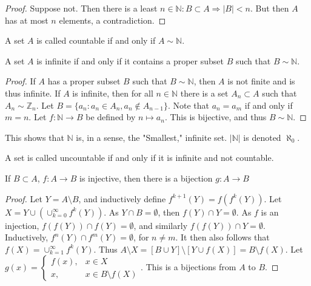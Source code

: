 \documentclass[crop=false,class=book,oneside]{standalone}
\begin{document}
            \begin{proof}
            Suppose not. Then there is a least $n\in \mathbb{N}:B\subset A\Rightarrow |B|<n$. But then $A$ has at most $n$ elements, a contradiction.
            \end{proof}
            \begin{definition}
            A set $A$ is called countable if and only if $A\sim \mathbb{N}$.
            \end{definition}
            \begin{theorem}
            A set $A$ is infinite if and only if it contains a proper subset $B$ such that $B\sim \mathbb{N}$.
            \end{theorem}
            \begin{proof}
            If $A$ has a proper subset $B$ such that $B\sim \mathbb{N}$, then $A$ is not finite and is thus infinite. If $A$ is infinite, then for all $n\in \mathbb{N}$ there is a set $A_n\subset A$ such that $A_n \sim \mathbb{Z}_n$. Let $B = \{a_n: a_n \in A_n, a_n \notin A_{n-1}\}$. Note that $a_{n} = a_{m}$ if and only if $m= n$. Let $f:\mathbb{N} \rightarrow B$ be defined by $n\mapsto a_n$. This is bijective, and thus $B\sim \mathbb{N}$.
            \end{proof}
            \begin{remark}
            This shows that $\mathbb{N}$ is, in a sense, the "Smallest," infinite set. $|\mathbb{N}|$ is denoted $\aleph_0$.
            \end{remark}
            \begin{definition}
            A set is called uncountable if and only if it is infinite and not countable.
            \end{definition}
            \begin{lemma}
            If $B\subset A$, $f:A\rightarrow B$ is injective, then there is a bijection $g:A\rightarrow B$
            \end{lemma}
            \begin{proof}
            Let $Y = A\setminus B$, and inductively define $f^{k+1}(Y) = f(f^{k}(Y))$. Let $X = Y\cup (\cup_{k=0}^{\infty} f^{k}(Y))$. As $Y\cap B = \emptyset$, then $f(Y)\cap Y= \emptyset$. As $f$ is an injection, $f(f(Y))\cap f(Y)=\emptyset$, and similarly $f(f(Y))\cap Y = \emptyset$. Inductively, $f^{n}(Y)\cap f^{m}(Y) = \emptyset$, for $n\ne m$. It then also follows that $f(X) = \cup_{k=1}^{\infty} f^{k}(Y)$. Thus $A\setminus X = [B\cup Y]\setminus [Y\cup f(X)] = B\setminus f(X)$. Let $g(x) = \begin{cases} f(x), & x\in X \\ x, & x \in B\setminus f(X)\end{cases}$. This is a bijections from $A$ to $B$.
            \end{proof}
\end{document}
